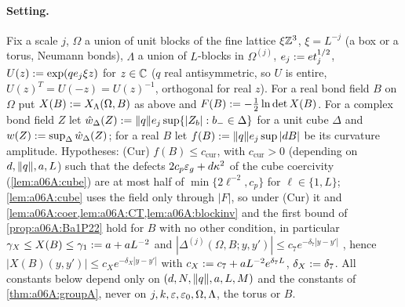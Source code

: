 \paragraph{Setting.} Fix a scale $j$, $\Omega$ a union of unit blocks of the fine lattice $\xi\mathbb Z^3$, $\xi=L^{-j}$ (a box or a torus, Neumann bonds), $\Lambda$ a union of $L$-blocks in $\Omega^{(j)}$, $e_j:= et_j^{1/2}$, $U(z):=\exp(qe_j\xi z)$ for $z\in\mathbb C$ ($q$ real antisymmetric, so $U$ is entire, $U(z)^T=U(-z)=U(z)^{-1}$, orthogonal for real $z$). For a real bond field $B$ on $\Omega$ put $X(B):= X_\Lambda(\Omega,B)$ as above and $F(B):=-\frac12\ln\det X(B)$. For a complex bond field $Z$ let $\hat w_\Delta(Z):=\lVert q\rVert e_j\sup\{|Z_b|:b_-\in\Delta\}$ for a unit cube $\Delta$ and $w(Z):=\sup_\Delta\hat w_\Delta(Z)$; for a real $B$ let $f(B):=\lVert q\rVert e_j\sup|dB|$ be its curvature amplitude. Hypotheses: (Cur) $f(B)\le c_{\mathrm{cur}}$, with $c_{\mathrm{cur}}>0$ (depending on $d,\lVert q\rVert,a,L$) such that the defects $2c_p\varepsilon_g+d\kappa^2$ of the cube coercivity (\cref{lem:a06A:cube}) are at most half of $\min\{2\ell^{-2},c_p\}$ for $\ell\in\{1,L\}$; \cref{lem:a06A:cube} uses the field only through $|F|$, so under (Cur) it and \cref{lem:a06A:coer,lem:a06A:CT,lem:a06A:blockinv} and the first bound of \cref{prop:a06A:Ba1P22} hold for $B$ with no other condition, in particular $\gamma_X\le X(B)\le\gamma_1:= a+aL^{-2}$ and $|\Delta^{(j)}(\Omega,B;y,y')|\le c_7e^{-\delta_7|y-y'|}$ \cite[Prop.~2.2, (2.27)]{Ba1}, hence $|X(B)(y,y')|\le c_Xe^{-\delta_X|y-y'|}$ with $c_X:= c_7+aL^{-2}e^{\delta_7L}$, $\delta_X:=\delta_7$. All constants below depend only on $(d,N,\lVert q\rVert,a,L,M)$ and the constants of \cref{thm:a06A:groupA}, never on $j,k,\varepsilon,\varepsilon_0,\Omega,\Lambda$, the torus or $B$.

